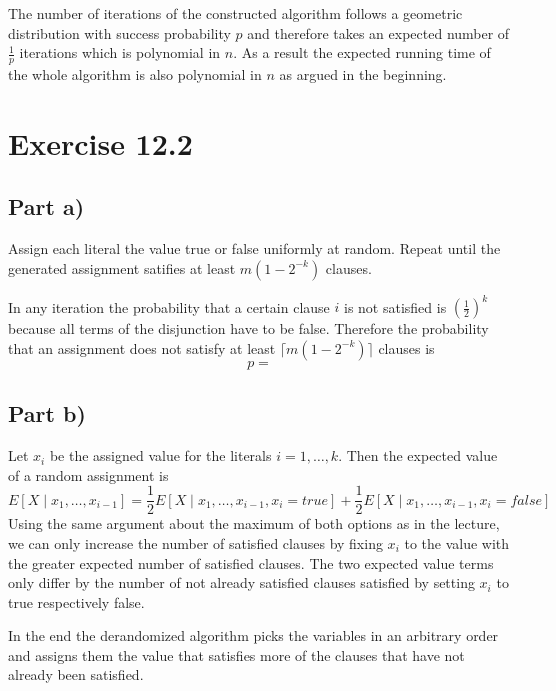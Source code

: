 \documentclass[10pt,a4paper]{article}
\begin{document}
The number of iterations of the constructed algorithm follows a geometric distribution with success probability $p$ and therefore takes an expected number of $\frac{1}{p}$ iterations which is polynomial in $n$.
As a result the expected running time of the whole algorithm is also polynomial in $n$ as argued in the beginning.

\section*{Exercise 12.2}

\subsection*{Part a)}

Assign each literal the value true or false uniformly at random.
Repeat until the generated assignment satifies at least $m(1 - 2^{-k})$ clauses.

In any iteration the probability that a certain clause $i$ is not satisfied is $\left( \frac{1}{2} \right)^{k}$ because all terms of the disjunction have to be false.
Therefore the probability that an assignment does not satisfy at least $\lceil m(1 - 2^{-k}) \rceil$ clauses is
\begin{equation*}
  p =
\end{equation*}

\subsection*{Part b)}

Let $x_{i}$ be the assigned value for the literals $i = 1, \dots, k$.
Then the expected value of a random assignment is
\begin{equation*}
  E[X \mid x_{1}, \dots, x_{i - 1}] = \frac{1}{2} E[X \mid x_{1}, \dots, x_{i - 1}, x_{i} = true] + \frac{1}{2} E[X \mid x_{1}, \dots, x_{i - 1}, x_{i} = false]
\end{equation*}
Using the same argument about the maximum of both options as in the lecture, we can only increase the number of satisfied clauses by fixing $x_{i}$ to the value with the greater expected number of satisfied clauses.
The two expected value terms only differ by the number of not already satisfied clauses satisfied by setting $x_{i}$ to true respectively false.

In the end the derandomized algorithm picks the variables in an arbitrary order and assigns them the value that satisfies more of the clauses that have not already been satisfied.
\end{document}
